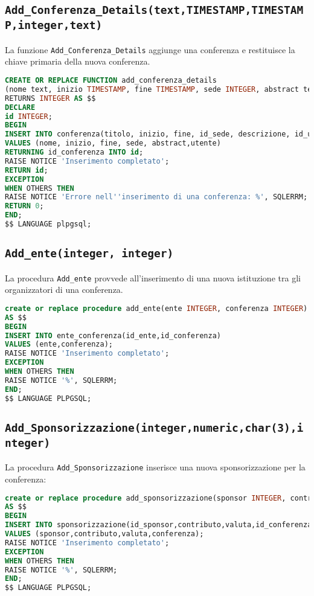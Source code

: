 \subsection{\texttt{Add\_Conferenza\_Details(text,TIMESTAMP,TIMESTAMP,integer,text)}}
La funzione \texttt{Add\_Conferenza\_Details} aggiunge una conferenza e restituisce la chiave primaria della nuova conferenza.
\begin{lstlisting}[language=SQL,style=mystyle]
CREATE OR REPLACE FUNCTION add_conferenza_details
(nome text, inizio TIMESTAMP, fine TIMESTAMP, sede INTEGER, abstract text, utente INTEGER)
RETURNS INTEGER AS $$
DECLARE
id INTEGER;
BEGIN
INSERT INTO conferenza(titolo, inizio, fine, id_sede, descrizione, id_utente) 
VALUES (nome, inizio, fine, sede, abstract,utente)
RETURNING id_conferenza INTO id;
RAISE NOTICE 'Inserimento completato';
RETURN id;
EXCEPTION
WHEN OTHERS THEN
RAISE NOTICE 'Errore nell''inserimento di una conferenza: %', SQLERRM;
RETURN 0; 
END;
$$ LANGUAGE plpgsql;
\end{lstlisting}
\subsection{\texttt{Add\_ente(integer, integer)}}
La procedura \texttt{Add\_ente} provvede all'inserimento di una nuova istituzione tra gli organizzatori di una conferenza.
\begin{lstlisting}[language=SQL,style=mystyle]
create or replace procedure add_ente(ente INTEGER, conferenza INTEGER)
AS $$
BEGIN
INSERT INTO ente_conferenza(id_ente,id_conferenza)
VALUES (ente,conferenza);
RAISE NOTICE 'Inserimento completato';
EXCEPTION
WHEN OTHERS THEN
RAISE NOTICE '%', SQLERRM;
END;
$$ LANGUAGE PLPGSQL;
\end{lstlisting}
\subsection{\texttt{Add\_Sponsorizzazione(integer,numeric,char(3),integer)}}
La procedura \texttt{Add\_Sponsorizzazione} inserisce una nuova sponsorizzazione per la conferenza:
\begin{lstlisting}[language=SQL, style=mystyle]
create or replace procedure add_sponsorizzazione(sponsor INTEGER, contributo numeric(1000,2), valuta char(3), conferenza INTEGER)
AS $$
BEGIN
INSERT INTO sponsorizzazione(id_sponsor,contributo,valuta,id_conferenza)
VALUES (sponsor,contributo,valuta,conferenza);
RAISE NOTICE 'Inserimento completato';
EXCEPTION
WHEN OTHERS THEN
RAISE NOTICE '%', SQLERRM;
END;
$$ LANGUAGE PLPGSQL;
\end{lstlisting}

